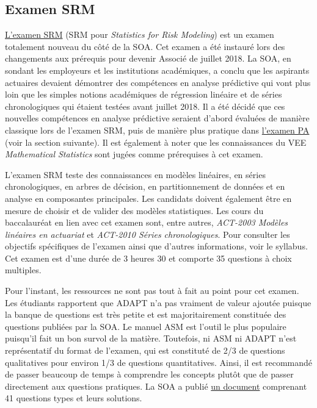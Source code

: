 \subsection*{Examen SRM}
\label{subsec:examsrm}

\href{https://www.soa.org/Education/Exam-Req/edu-exam-srm-detail.aspx}{L'examen SRM} (SRM pour \textit{Statistics for Risk Modeling}) est un examen totalement nouveau du côté de la SOA. Cet examen a été instauré lors des changements aux prérequis pour devenir Associé de juillet 2018. La SOA, en sondant les employeurs et les institutions académiques, a conclu que les aspirants actuaires devaient démontrer des compétences en analyse prédictive qui vont plus loin que les simples notions académiques de régression linéaire et de séries chronologiques qui étaient testées avant juillet 2018. Il a été décidé que ces nouvelles compétences en analyse prédictive seraient d'abord évaluées de manière classique lors de l'examen SRM, puis de manière plus pratique dans \href{https://www.soa.org/Education/Exam-Req/edu-exam-pa-detail.aspx}{l'examen PA} (voir la section suivante). Il est également à noter que les connaissances du VEE \textit{Mathematical Statistics} sont jugées comme prérequises à cet examen. \vspace{\baselineskip}

L'examen SRM teste des connaissances en modèles linéaires, en séries chronologiques, en arbres de décision, en partitionnement de données et en analyse en composantes principales. Les candidats doivent également être en mesure de choisir et de valider des modèles statistiques. Les cours du baccalauréat en lien avec cet examen sont, entre autres, \textit{ACT-2003 Modèles linéaires en actuariat} et \textit{ACT-2010 Séries chronologiques}. Pour consulter les objectifs spécifiques de l'examen ainsi que d'autres informations, voir le syllabus. Cet examen est d'une durée de 3 heures 30 et comporte 35 questions à choix multiples. \vspace{\baselineskip}

Pour l'instant, les ressources ne sont pas tout à fait au point pour cet examen. Les étudiants rapportent que ADAPT n'a pas vraiment de valeur ajoutée puisque la banque de questions est très petite et est majoritairement constituée des questions publiées par la SOA. Le manuel ASM est l'outil le plus populaire puisqu'il fait un bon survol de la matière. Toutefois, ni ASM ni ADAPT n'est représentatif du format de l'examen, qui est constituté de 2/3 de questions qualitatives pour environ 1/3 de questions quantitatives. Ainsi, il est recommandé de passer beaucoup de temps à comprendre les concepts plutôt que de passer directement aux questions pratiques. La SOA a publié \href{https://www.soa.org/Files/Edu/2018/exam-srm-sample-questions.pdf}{un document} comprenant 41 questions types et leurs solutions.  \vspace{\baselineskip} \newpage


